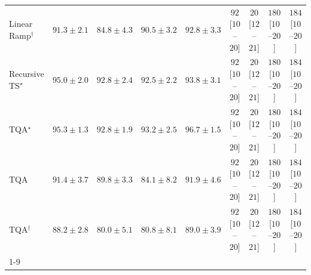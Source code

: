 \begin{tabular}{l|cccc|cccc|}
Linear Ramp$^\dagger$ & {\cellcolor[HTML]{0A73B2}} \color[HTML]{F1F1F1} $91.3\pm 2.1$ & {\cellcolor[HTML]{73A9CF}} \color[HTML]{F1F1F1} $84.8\pm 4.3$ & {\cellcolor[HTML]{167BB6}} \color[HTML]{F1F1F1} $90.5\pm 3.2$ & {\cellcolor[HTML]{0569A5}} \color[HTML]{F1F1F1} $92.8\pm 3.3$ & {\cellcolor[HTML]{F769A1}} \color[HTML]{F1F1F1} $92$ [$10$--$20$] & {\cellcolor[HTML]{FDE4E1}} \color[HTML]{000000} $20$ [$12$--$21$] & {\cellcolor[HTML]{51006C}} \color[HTML]{F1F1F1} $180$ [$10$--$20$] & {\cellcolor[HTML]{49006A}} \color[HTML]{F1F1F1} $184$ [$10$--$20$] \\
Recursive TS$^\star$ & {\cellcolor[HTML]{045B8E}} \color[HTML]{F1F1F1} $95.0\pm 2.0$ & {\cellcolor[HTML]{0569A5}} \color[HTML]{F1F1F1} $92.8\pm 2.4$ & {\cellcolor[HTML]{056BA7}} \color[HTML]{F1F1F1} $92.5\pm 2.2$ & {\cellcolor[HTML]{04629A}} \color[HTML]{F1F1F1} $93.8\pm 3.1$ & {\cellcolor[HTML]{F769A1}} \color[HTML]{F1F1F1} $92$ [$10$--$20$] & {\cellcolor[HTML]{FDE4E1}} \color[HTML]{000000} $20$ [$12$--$21$] & {\cellcolor[HTML]{51006C}} \color[HTML]{F1F1F1} $180$ [$10$--$20$] & {\cellcolor[HTML]{49006A}} \color[HTML]{F1F1F1} $184$ [$10$--$20$] \\
TQA$^\star$ & {\cellcolor[HTML]{04598C}} \color[HTML]{F1F1F1} $95.3\pm 1.3$ & {\cellcolor[HTML]{0569A5}} \color[HTML]{F1F1F1} $92.8\pm 1.9$ & {\cellcolor[HTML]{0567A1}} \color[HTML]{F1F1F1} $93.2\pm 2.5$ & {\cellcolor[HTML]{034B76}} \color[HTML]{F1F1F1} $96.7\pm 1.5$ & {\cellcolor[HTML]{F769A1}} \color[HTML]{F1F1F1} $92$ [$10$--$20$] & {\cellcolor[HTML]{FDE4E1}} \color[HTML]{000000} $20$ [$12$--$21$] & {\cellcolor[HTML]{51006C}} \color[HTML]{F1F1F1} $180$ [$10$--$20$] & {\cellcolor[HTML]{49006A}} \color[HTML]{F1F1F1} $184$ [$10$--$20$] \\
TQA & {\cellcolor[HTML]{0872B1}} \color[HTML]{F1F1F1} $91.4\pm 3.7$ & {\cellcolor[HTML]{2081B9}} \color[HTML]{F1F1F1} $89.8\pm 3.3$ & {\cellcolor[HTML]{7DACD1}} \color[HTML]{F1F1F1} $84.1\pm 8.2$ & {\cellcolor[HTML]{056FAE}} \color[HTML]{F1F1F1} $91.9\pm 4.6$ & {\cellcolor[HTML]{F769A1}} \color[HTML]{F1F1F1} $92$ [$10$--$20$] & {\cellcolor[HTML]{FDE4E1}} \color[HTML]{000000} $20$ [$12$--$21$] & {\cellcolor[HTML]{51006C}} \color[HTML]{F1F1F1} $180$ [$10$--$20$] & {\cellcolor[HTML]{49006A}} \color[HTML]{F1F1F1} $184$ [$10$--$20$] \\
TQA$^\dagger$ & {\cellcolor[HTML]{3790C0}} \color[HTML]{F1F1F1} $88.2\pm 2.8$ & {\cellcolor[HTML]{B5C4DF}} \color[HTML]{000000} $80.0\pm 5.1$ & {\cellcolor[HTML]{ACC0DD}} \color[HTML]{000000} $80.8\pm 8.1$ & {\cellcolor[HTML]{2C89BD}} \color[HTML]{F1F1F1} $89.0\pm 3.9$ & {\cellcolor[HTML]{F769A1}} \color[HTML]{F1F1F1} $92$ [$10$--$20$] & {\cellcolor[HTML]{FDE4E1}} \color[HTML]{000000} $20$ [$12$--$21$] & {\cellcolor[HTML]{51006C}} \color[HTML]{F1F1F1} $180$ [$10$--$20$] & {\cellcolor[HTML]{49006A}} \color[HTML]{F1F1F1} $184$ [$10$--$20$] \\
\cline{1-9}
\bottomrule
\end{tabular}
